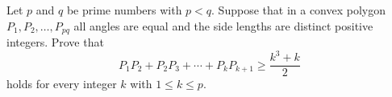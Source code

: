 Let \(p\) and \(q\) be prime numbers with \(p<q\). Suppose that in a convex polygon \(P_1,P_2,\ldots,P_{pq}\) all angles are equal and the side lengths are distinct positive integers. Prove that
\[P_1P_2+P_2P_3+\cdots +P_kP_{k+1}\geqslant \frac{k^3+k}{2}\]holds for every integer \(k\) with \(1\leqslant k\leqslant p\).

